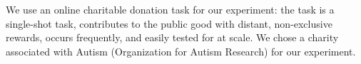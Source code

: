 

We use an online charitable donation task for our experiment: the task is a  single-shot task, contributes to the public good with distant, non-exclusive rewards, occurs frequently, and easily tested for at scale. We chose a charity associated with Autism (Organization for Autism Research) for our experiment.

